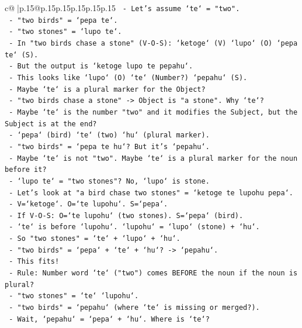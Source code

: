 \documentclass{article}
\begin{document}
{\begin{supertabular}{c@{$\;$}|p{.15\linewidth}@{}p{.15\linewidth}p{.15\linewidth}p{.15\linewidth}p{.15\linewidth}p{.15\linewidth}}
{{{\texttt{   {-} Let's assume `te` = "two".} \\
\texttt{   {-} "two birds" = `pepa te`.} \\
\texttt{   {-} "two stones" = `lupo te`.} \\
\texttt{   {-} In "two birds chase a stone" (V{-}O{-}S): `ketoge` (V) `lupo` (O) `pepa te` (S).} \\
\texttt{   {-} But the output is `ketoge lupo te pepahu`.} \\
\texttt{   {-} This looks like `lupo` (O) `te` (Number?) `pepahu` (S).} \\
\texttt{   {-} Maybe `te` is a plural marker for the Object?} \\
\texttt{   {-} "two birds chase a stone" {-}> Object is "a stone". Why `te`?} \\
\texttt{   {-} Maybe `te` is the number "two" and it modifies the Subject, but the Subject is at the end?} \\
\texttt{   {-} `pepa` (bird) `te` (two) `hu` (plural marker).} \\
\texttt{   {-} "two birds" = `pepa te hu`? But it's `pepahu`.} \\
\texttt{   {-} Maybe `te` is not "two". Maybe `te` is a plural marker for the noun before it?} \\
\texttt{   {-} `lupo te` = "two stones"? No, `lupo` is stone.} \\
\texttt{   {-} Let's look at "a bird chase two stones" = `ketoge te lupohu pepa`.} \\
\texttt{   {-} V=`ketoge`. O=`te lupohu`. S=`pepa`.} \\
\texttt{   {-} If V{-}O{-}S: O=`te lupohu` (two stones). S=`pepa` (bird).} \\
\texttt{   {-} `te` is before `lupohu`. `lupohu` = `lupo` (stone) + `hu`.} \\
\texttt{   {-} So "two stones" = `te` + `lupo` + `hu`.} \\
\texttt{   {-} "two birds" = `pepa` + `te` + `hu`? {-}> `pepahu`.} \\
\texttt{   {-} This fits!} \\
\texttt{   {-} Rule: Number word `te` ("two") comes BEFORE the noun if the noun is plural?} \\
\texttt{   {-} "two stones" = `te` `lupohu`.} \\
\texttt{   {-} "two birds" = `pepahu` (where `te` is missing or merged?).} \\
\texttt{   {-} Wait, `pepahu` = `pepa` + `hu`. Where is `te`?} \\
}}}
\end{supertabular}}
\end{document}
